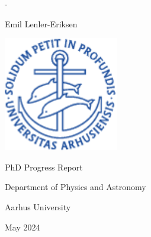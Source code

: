 

\AtBeginShipoutNext{\AtBeginShipoutNext{\AtBeginShipoutDiscard}}

\begin{titlingpage}
  \newlength{\frontpagecorrection}
  \calccentering{\frontpagecorrection}
  \begin{adjustwidth*}{\frontpagecorrection-2cm}{-\frontpagecorrection-2cm}

    \centering
    \sffamily

    \vspace*{0.1cm}

    \fontsize{26pt}{29pt}\selectfont

    \projecttitle \par

    \vspace{0.8cm}

    \fontsize{18pt}{22pt}\selectfont

    Emil Lenler-Eriksen \par

    \vspace{2.7cm}

    \includegraphics[width=5cm]{front/segla1b}

    \vspace{2.7cm}

    PhD Progress Report

    \vspace{1.0cm}

    \fontsize{14pt}{17pt}\selectfont

    Department of Physics and Astronomy\par
    Aarhus University\par

    \vspace{0.3cm}

    May 2024

  \end{adjustwidth*}
\end{titlingpage}


